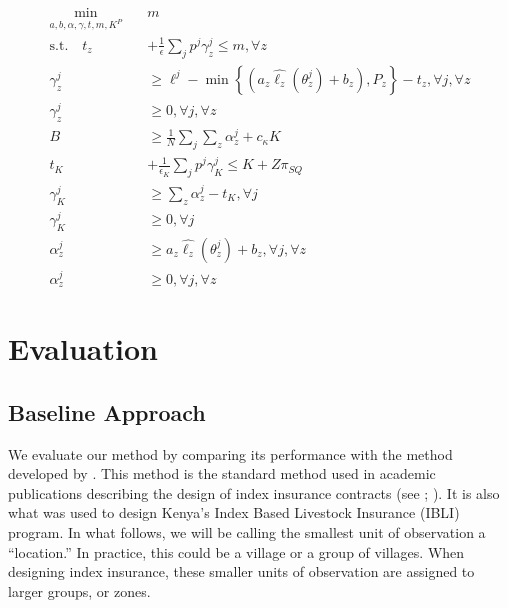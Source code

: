 \documentclass[11pt]{article}
\begin{document}
    \begin{align}
      \min_{a,b,\alpha,\gamma,t,m,K^P} \quad & m\\
      \text{s.t.} \quad t_z &+ \frac{1}{\epsilon} \sum_j p^j \gamma_z^j \leq m, \forall z\\
      \gamma_z^j &\geq \ell^j - \min\left\{(a_z\hat{\ell_z}(\theta_z^j) + b_z), P_z\right\} -t_z, \forall j, \forall z \\
      \gamma_z^j &\geq 0, \forall j, \forall z\\
      B &\geq \frac{1}{N} \sum_j \sum_z \alpha^j_z + c_{\kappa} K\\
      t_K &+ \frac{1}{\epsilon_K} \sum_j p^j \gamma_K^j \leq K+Z\pi_{SQ}\\
      \gamma_K^j &\geq \sum_z \alpha^j_z -t_K, \forall j \\
      \gamma_K^j &\geq 0, \forall j\\
      \alpha^j_z &\geq a_z \hat{\ell_z}(\theta^j_z) + b_z, \forall j, \forall z\\
      \alpha^j_z &\geq 0, \forall j, \forall z
    \end{align}

\section{Evaluation}
  \subsection{Baseline Approach}\label{baseline}
   We evaluate our method by comparing its performance with the method developed by \cite{chantarat2013designing}. This method is the standard method used in academic publications describing the design of index insurance contracts (see \cite{flatnes2018improving}; \cite{jensen2019does}). It is also what was used to design Kenya's Index Based Livestock Insurance (IBLI) program. In what follows, we will be calling the smallest unit of observation a ``location.'' In practice, this could be a village or a group of villages. When designing index insurance, these smaller units of observation are assigned to larger groups, or zones. 
\end{document}
